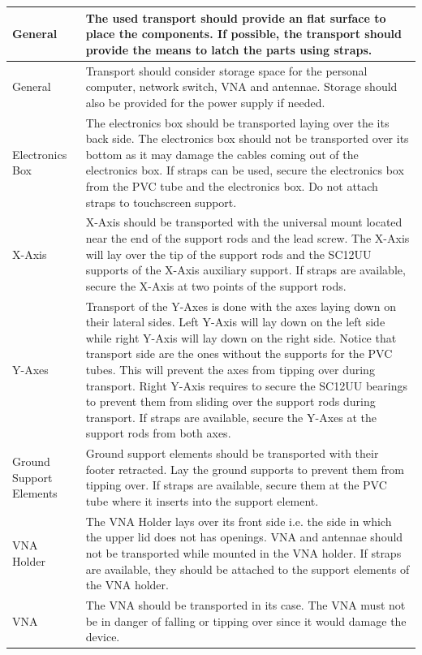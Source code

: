 \documentclass{article}
\begin{document}
\begin{onehalfspacing}
\begin{xltabular}{\textwidth}{|p{5cm}|X|}
        General & The used transport should provide an flat surface to place the components. If possible, the transport should provide the means to latch the parts using straps.  \\ \hline
        General & Transport should consider storage space for the personal computer, network switch, VNA and antennae. Storage should also be provided for the power supply if needed. \\ \hline
        Electronics Box & The electronics box should be transported laying over the its back side. The electronics box should not be transported over its bottom as it may damage the cables coming out of the electronics box. If straps can  be used, secure the electronics box from the PVC tube and the electronics box. Do not attach straps to touchscreen support. \\ \hline
        X-Axis & X-Axis should be transported with the universal mount located near the end of the support rods and the lead screw. The X-Axis will lay over the tip of the support rods and the SC12UU supports of the X-Axis auxiliary support. If straps are available, secure the X-Axis at two points of the support rods. \\ \hline
        Y-Axes & Transport of the Y-Axes is done with the axes laying down on their lateral sides. Left Y-Axis will lay down on the left side while right Y-Axis will lay down on the right side. Notice that transport side are the ones without the supports for the PVC tubes. This will prevent the axes from tipping over during transport. Right Y-Axis requires to secure the SC12UU bearings to prevent them from sliding over the support rods during transport. If straps are available, secure the Y-Axes at the support rods from both axes. \\ \hline
        Ground Support Elements & Ground support elements should be transported with their footer retracted. Lay the ground supports to prevent them from tipping over. If straps are available, secure them at the PVC tube where it inserts into the support element. \\ \hline
        VNA Holder & The VNA Holder lays over its front side i.e. the side in which the upper lid does not has openings. VNA and antennae should not be transported while mounted in the VNA holder. If straps are available, they should be attached to the support elements of the VNA holder. \\ \hline
        VNA & The VNA should be transported in its case. The VNA must not be in danger of falling or tipping over since it would damage the device. \\ \hline
    \end{xltabular}
\end{onehalfspacing}
\end{document}
